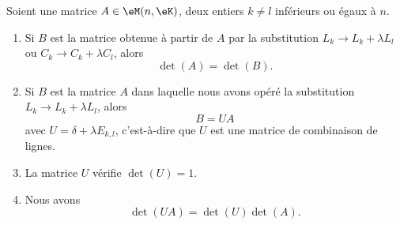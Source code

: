 \begin{proposition}       \label{PROPooPYNHooLbeVhj}
	Soient une matrice \( A\in \eM(n,\eK)\), deux entiers \( k\neq l\) inférieurs ou égaux à \( n\).
	\begin{enumerate}
		\item       \label{ITEMooJSRDooTggEyO}
		      Si \( B\) est la matrice obtenue à partir de \( A\) par la substitution \( L_k\to L_k+\lambda L_l\) ou \( C_k\to C_k+\lambda C_l\), alors
		      \begin{equation}
			      \det(A)=\det(B).
		      \end{equation}
		\item       \label{ITEMooHKZWooVZDgnf}
		      Si \( B\) est la matrice \( A\) dans laquelle nous avons opéré la substitution \( L_k\to L_k+\lambda L_l\), alors
		      \begin{equation}
			      B=UA
		      \end{equation}
		      avec \( U=\delta+\lambda E_{k,l}\), c'est-à-dire que \( U\) est une matrice de combinaison de lignes.
		\item       \label{ITEMooPGYJooWTTghT}
		      La matrice \( U\) vérifie \( \det(U)=1\).
		\item       \label{ITEMooBBEAooZJVGNV}
		      Nous avons
		      \begin{equation}
			      \det(UA)=\det(U)\det(A).
		      \end{equation}
	\end{enumerate}
\end{proposition}

